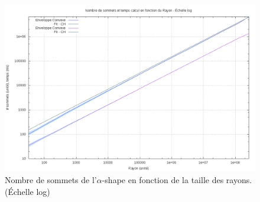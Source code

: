 \begin{figure}[H]
  \centering
  \includegraphics[width=\linewidth]{fig/4-exi/ch/exi-ch-sommet.png}
  \caption{Nombre de sommets de l'$\alpha$-shape en fonction de la taille des rayons. (Échelle log)}
\end{figure}


